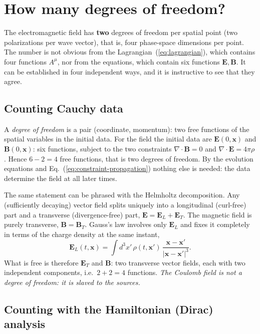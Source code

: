 \documentclass[11pt,a4paper]{book}
\begin{document}
\section{How many degrees of freedom?}
\label{sec:dof}

The electromagnetic field has \textbf{two} degrees of freedom per spatial point (two
polarizations per wave vector), that is, four phase-space dimensions per point.
The number is not obvious from the Lagrangian~(\ref{eq:lagrangian}), which contains four
functions $A^\mu$, nor from the equations, which contain six functions $\mathbf E,\mathbf B$.
It can be established in four independent ways, and it is instructive to see that they agree.

\subsection{Counting Cauchy data}

A \emph{degree of freedom} is a pair (coordinate, momentum): two free functions of
the spatial variables in the initial data. For the field the initial data are
$\mathbf E(0,\mathbf x)$ and $\mathbf B(0,\mathbf x)$: six functions, subject to the two constraints
$\nabla\cdot\mathbf B=0$ and $\nabla\cdot\mathbf E=4\pi\rho$. Hence $6-2=4$ free functions,
that is two degrees of freedom. By the evolution equations and
Eq.~(\ref{eq:constraint-propagation}) nothing else is needed: the data determine the field
at all later times.

The same statement can be phrased with the Helmholtz decomposition. Any (sufficiently
decaying) vector field splits uniquely into a longitudinal (curl-free) part and a transverse
(divergence-free) part, $\mathbf E=\mathbf E_L+\mathbf E_T$. The magnetic field is purely
transverse, $\mathbf B=\mathbf B_T$. Gauss's law involves only $\mathbf E_L$ and fixes it
completely in terms of the charge density at the same instant,
\begin{equation}
\mathbf E_L(t,\mathbf x)=\int d^3x'\,\rho(t,\mathbf x')\,
\frac{\mathbf x-\mathbf x'}{|\mathbf x-\mathbf x'|^3}.
\label{eq:EL}
\end{equation}
What is free is therefore $\mathbf E_T$ and $\mathbf B$: two transverse vector fields,
each with two independent components, i.e.\ $2+2=4$ functions.
\emph{The Coulomb field is not a degree of freedom: it is slaved to the sources.}

\subsection{Counting with the Hamiltonian (Dirac) analysis}
\end{document}
